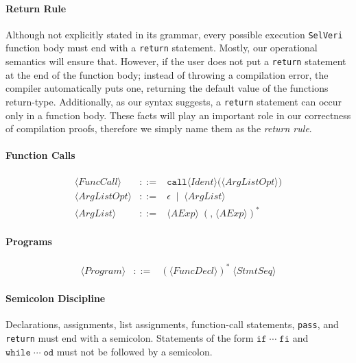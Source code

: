 \documentclass{article}
\begin{document}
\paragraph{Return Rule}
Although not explicitly stated in its grammar, every possible execution \texttt{SelVeri} function body must end with a \texttt{return} statement. Mostly, our operational semantics will ensure that. However, if the user does not put a \texttt{return} statement at the end of the function body; instead of throwing a compilation error, the compiler automatically puts one, returning the default value of the functions return-type. Additionally, as our syntax suggests, a \texttt{return} statement can occur only in a function body.  These facts will play an important role in our correctness of compilation proofs, therefore we simply name them as the \textit{return rule}.

\paragraph{Function Calls}
\[
\begin{array}{rcl}
\langle \mathit{FuncCall} \rangle
&::=&
\mathtt{call} \langle \mathit{Ident} \rangle\texttt{(}\langle \mathit{ArgListOpt} \rangle\texttt{)} \\[4pt]

\langle \mathit{ArgListOpt} \rangle
&::=&
\epsilon
\;\mid\;
\langle \mathit{ArgList} \rangle \\[4pt]

\langle \mathit{ArgList} \rangle
&::=&
\langle \mathit{AExp} \rangle\;(\texttt{,}\;\langle \mathit{AExp} \rangle)^*
\end{array}
\]

\paragraph{Programs}
\[
\begin{array}{rcl}
\langle \mathit{Program} \rangle
&::=&
(\langle \mathit{FuncDecl} \rangle)^*\;\langle \mathit{StmtSeq} \rangle
\end{array}
\]

\paragraph{Semicolon Discipline}
Declarations, assignments, list assignments, function-call statements, \texttt{pass}, and \texttt{return}
must end with a semicolon. Statements of the form
\(\mathtt{if}\;\cdots\;\mathtt{fi}\) and
\(\mathtt{while}\;\cdots\;\mathtt{od}\) must not be followed by a semicolon.
\end{document}
